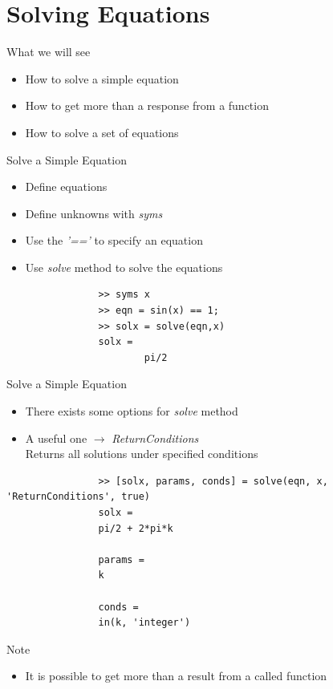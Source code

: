 \documentclass{beamer}
\begin{document}
\section{Solving Equations}
\begin{frame}{What we will see}
	\begin{block}{}
		\begin{itemize}
			\item How to  solve a simple equation
			\item How to get more than a response from a function
			\item How to solve a set of equations 
		\end{itemize}
	\end{block}
\end{frame}

\begin{frame}[fragile]{Solve a Simple Equation}
	\begin{block}{}
		\begin{itemize}
			\item Define equations
			\item Define unknowns with \textit{syms}
			\item Use the \textit{'=='} to specify an equation
			\item Use \textit{solve} method to solve the equations
		\end{itemize}
		\java
			\begin{lstlisting}
				>> syms x
				>> eqn = sin(x) == 1;
				>> solx = solve(eqn,x)
				solx =
						pi/2
			\end{lstlisting}
	\end{block}
\end{frame}

\begin{frame}[fragile]{Solve a Simple Equation}
	\begin{block}{}
		\begin{itemize}
			\item There exists some options for \textit{solve} method
			\item A useful one $\rightarrow$ \textit{ReturnConditions}\\
			Returns all solutions under specified conditions
		\end{itemize}
		\java
			\begin{lstlisting}
				>> [solx, params, conds] = solve(eqn, x, 'ReturnConditions', true)
				solx =
				pi/2 + 2*pi*k

				params =
				k

				conds =
				in(k, 'integer')
			\end{lstlisting}
		\begin{alertblock}{Note}
		\begin{itemize}
			\item It is possible to get more than a result from a called function
		\end{itemize}
		\end{alertblock}
	\end{block}
\end{frame}
\end{document}
